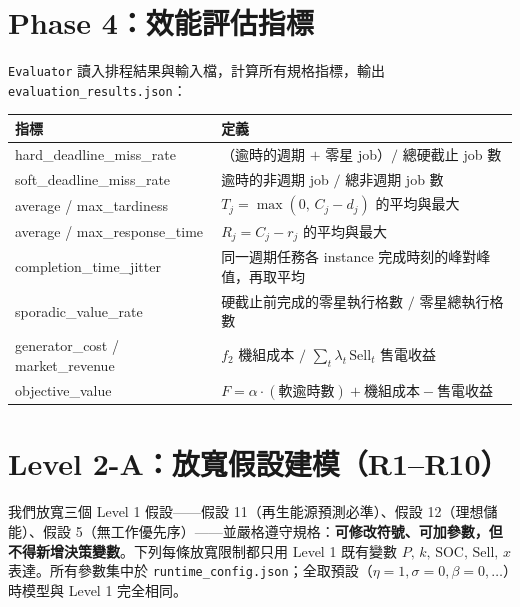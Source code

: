 \documentclass[12pt,a4paper,fontset=none]{ctexart}
\newcommand{\fn}[1]{\texttt{\small #1}}
\begin{document}
\section{Phase 4：效能評估指標}
\fn{Evaluator} 讀入排程結果與輸入檔，計算所有規格指標，輸出 \fn{evaluation\_results.json}：
\begin{center}
\begin{tabularx}{\linewidth}{lX}
\toprule
\textbf{指標} & \textbf{定義} \\
\midrule
hard\_deadline\_miss\_rate & （逾時的週期 $+$ 零星 job）$/$ 總硬截止 job 數 \\
soft\_deadline\_miss\_rate & 逾時的非週期 job $/$ 總非週期 job 數 \\
average / max\_tardiness & $T_j=\max(0,\,C_j-d_j)$ 的平均與最大 \\
average / max\_response\_time & $R_j=C_j-r_j$ 的平均與最大 \\
completion\_time\_jitter & 同一週期任務各 instance 完成時刻的峰對峰值，再取平均 \\
sporadic\_value\_rate & 硬截止前完成的零星執行格數 $/$ 零星總執行格數 \\
generator\_cost / market\_revenue & $f_2$ 機組成本 $/$ $\sum_t \lambda_t\,\mathrm{Sell}_t$ 售電收益 \\
objective\_value & $F=\alpha\cdot(\text{軟逾時數})+\text{機組成本}-\text{售電收益}$ \\
\bottomrule
\end{tabularx}
\end{center}

\section{Level 2-A：放寬假設建模（R1--R10）}
我們放寬三個 Level 1 假設——假設 11（再生能源預測必準）、假設 12（理想儲能）、假設 5（無工作優先序）——並嚴格遵守規格：\textbf{可修改符號、可加參數，但不得新增決策變數}。下列每條放寬限制都只用 Level 1 既有變數 $P,\,k,\,\mathrm{SOC},\,\mathrm{Sell},\,x$ 表達。所有參數集中於 \fn{runtime\_config.json}；全取預設（$\eta=1,\sigma=0,\beta=0,\dots$）時模型與 Level 1 完全相同。
\end{document}
